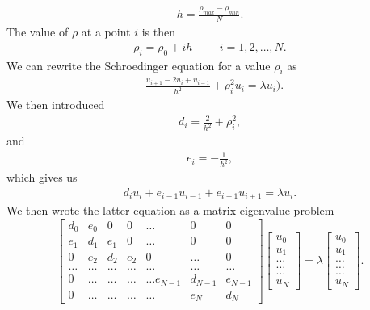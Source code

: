\documentclass[a4paper]{article}
\begin{document}
\begin{align}
h = \frac{\rho_{max} - \rho_{min}}{N}.
\end{align}
The value of $\rho$ at a point $i$ is then 
\begin{align}
\rho_i= \rho_0 + ih \hspace{1cm} i=1,2,\dots , N.
\end{align}
We can rewrite the Schroedinger equation for a value $\rho_i$ as
\begin{align}
-\frac{u_{i+1} -2u_i +u_{i-1}}{h^2}+\rho_i^2u_i = \lambda u_i).
\end{align}
We then introduced
\begin{align}
   d_i=\frac{2}{h^2}+\rho_{i}^2,
\end{align}
and
\begin{align}
e_{i} = -\frac{1}{\hbar^2},
\end{align}
which gives us
\begin{align}
d_iu_i+e_{i-1}u_{i-1}+e_{i+1}u_{i+1}  = \lambda u_i.
\end{align}
We then wrote the latter equation as a matrix eigenvalue problem
\begin{equation}
\begin{bmatrix}d_0 & e_0 & 0   & 0    & \dots  &0     & 0 \\
e_1 & d_1 & e_1 & 0    & \dots  &0     &0 \\
0   & e_2 & d_2 & e_2  &0       &\dots & 0\\
\dots  & \dots & \dots & \dots  &\dots      &\dots & \dots\\
0   & \dots & \dots & \dots  &\dots  e_{N-1}     &d_{N-1} & e_{N-1}\\
0   & \dots & \dots & \dots  &\dots       &e_{N} & d_{N}
\end{bmatrix}  \begin{bmatrix} u_{0} \\
u_{1} \\
\dots\\ \dots\\ \dots\\
u_{N}
\end{bmatrix}=\lambda \begin{bmatrix} u_{0} \\
u_{1} \\
\dots\\ \dots\\ \dots\\
u_{N}
\end{bmatrix}.  
\label{eq:sematrix}
\end{equation}
\end{document}
